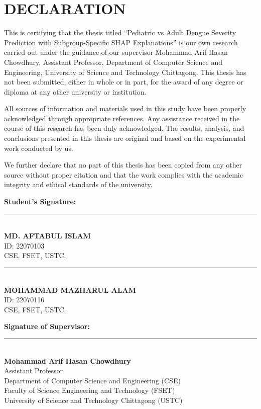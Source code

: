 \documentclass[12pt, a4paper]{report}
\begin{document}

\chapter*{DECLARATION}
This is certifying that the thesis titled ``Pediatric vs Adult Dengue Severity Prediction with Subgroup-Specific SHAP Explanations'' is our own research carried out under the guidance of our supervisor Mohammad Arif Hasan Chowdhury, Assistant Professor, Department of Computer Science and Engineering, University of Science and Technology Chittagong. This thesis has not been submitted, either in whole or in part, for the award of any degree or diploma at any other university or institution.

All sources of information and materials used in this study have been properly acknowledged through appropriate references. Any assistance received in the course of this research has been duly acknowledged. The results, analysis, and conclusions presented in this thesis are original and based on the experimental work conducted by us.

We further declare that no part of this thesis has been copied from any other source without proper citation and that the work complies with the academic integrity and ethical standards of the university.

\vspace{1cm}
\noindent
\textbf{Student's Signature:} \\[1.5cm]
\noindent
\begin{minipage}{0.45\textwidth}
\rule{6cm}{0.4pt} \\
\textbf{MD. AFTABUL ISLAM} \\
ID: 22070103 \\
CSE, FSET, USTC.
\end{minipage}
\hfill
\begin{minipage}{0.45\textwidth}
\rule{6cm}{0.4pt} \\
\textbf{MOHAMMAD MAZHARUL ALAM} \\
ID: 22070116 \\
CSE, FSET, USTC.
\end{minipage}

\vspace{1.5cm}
\noindent
\textbf{Signature of Supervisor:} \\[1.5cm]
\rule{6cm}{0.4pt} \\
\textbf{Mohammad Arif Hasan Chowdhury} \\
Assistant Professor \\
Department of Computer Science and Engineering (CSE)\\
Faculty of Science Engineering and Technology (FSET)\\
University of Science and Technology Chittagong (USTC)
\end{document}

